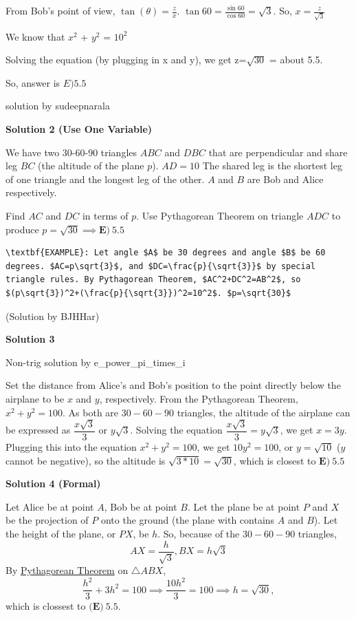 \begin{enumerate}
 From Bob's point of view, $\tan(\theta)=\frac{z}{x}$. $\tan{60}=\frac{\sin{60}}{\cos{60}}=\sqrt{3}$. So, $x = \frac{z}{\sqrt{3}}$

 We know that $x^2$ + $y^2$ = $10^2$

 Solving the equation (by plugging in x and y), we get z=$\sqrt{30}$ = about 5.5.  

 So, answer is $E) 5.5$

 solution by sudeepnarala

 



\textbf{Solution 2 (Use One Variable)}

We have two 30-60-90 triangles $ABC$ and $DBC$ that are perpendicular and share leg $BC$ (the altitude of the plane $p$). $AD=10$ The shared leg is the shortest leg of one triangle and the longest leg of the other. $A$ and $B$ are Bob and Alice respectively.

 
Find $AC$ and $DC$ in terms of $p$. Use Pythagorean Theorem on triangle $ADC$ to produce $p=\sqrt{30}\implies\boxed{\textbf{E)}\ 5.5}$
\begin{verbatim}
\textbf{EXAMPLE}: Let angle $A$ be 30 degrees and angle $B$ be 60 degrees. $AC=p\sqrt{3}$, and $DC=\frac{p}{\sqrt{3}}$ by special triangle rules. By Pythagorean Theorem, $AC^2+DC^2=AB^2$, so $(p\sqrt{3})^2+(\frac{p}{\sqrt{3}})^2=10^2$. $p=\sqrt{30}$
\end{verbatim}

(Solution by BJHHar)

 



\textbf{Solution 3}

Non-trig solution by e\_power\_pi\_times\_i

 
Set the distance from Alice's and Bob's position to the point directly below the airplane to be $x$ and $y$, respectively. From the Pythagorean Theorem, $x^2 + y^2 = 100$. As both are $30-60-90$ triangles, the altitude of the airplane can be expressed as $\dfrac{x\sqrt{3}}{3}$ or $y\sqrt{3}$. Solving the equation $\dfrac{x\sqrt{3}}{3} = y\sqrt{3}$, we get $x = 3y$. Plugging this into the equation $x^2 + y^2 = 100$, we get $10y^2 = 100$, or $y = \sqrt{10}$ ($y$ cannot be negative), so the altitude is $\sqrt{3*10} = \sqrt{30}$, which is closest to $\boxed{\textbf{E)}\ 5.5}$




\textbf{Solution 4 (Formal)}

Let Alice be at point $A$, Bob be at point $B$. Let the plane be at point $P$ and $X$ be the projection of $P$ onto the ground (the plane with contains $A$ and $B$). Let the height of the plane, or $PX$, be $h$. So, because of the $30-60-90$ triangles,
 \[AX = \dfrac{h}{\sqrt{3}}, BX = h\sqrt{3}\]By \href{https://artofproblemsolving.com/wiki/index.php?title=Pythagorean\_Theorem}{Pythagorean Theorem} on $\triangle ABX$,
 \[\dfrac{h^2}{3} + 3h^2 = 100 \implies \dfrac{10h^2}{3} = 100 \implies h = \sqrt{30},\]which is clossest to $\boxed{\textbf{(E)}\ 5.5}.$





\end{enumerate}
